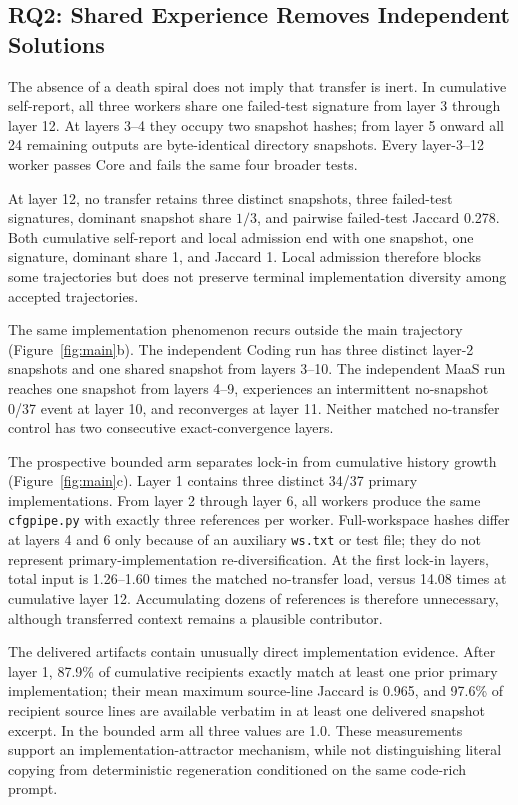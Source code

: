 \documentclass[letterpaper]{article}
\begin{document}
\subsection{RQ2: Shared Experience Removes Independent Solutions}

The absence of a death spiral does not imply that transfer is inert.
In cumulative self-report, all three workers share one failed-test signature
from layer 3 through layer 12.
At layers 3--4 they occupy two snapshot hashes; from layer 5 onward all 24
remaining outputs are byte-identical directory snapshots. Every layer-3--12
worker passes Core and fails the same four broader tests.

At layer 12, no transfer retains three distinct snapshots, three failed-test
signatures, dominant snapshot share $1/3$, and pairwise failed-test Jaccard
0.278. Both cumulative self-report and local admission end with one snapshot,
one signature, dominant share 1, and Jaccard 1. Local admission therefore blocks
some trajectories but does not preserve terminal implementation diversity among
accepted trajectories.

The same implementation phenomenon recurs outside the main trajectory
(Figure~\ref{fig:main}b). The independent Coding run has three distinct layer-2
snapshots and one shared snapshot from layers 3--10. The independent MaaS run
reaches one snapshot from layers 4--9, experiences an intermittent no-snapshot
0/37 event at layer 10, and reconverges at layer 11. Neither matched no-transfer
control has two consecutive exact-convergence layers.

The prospective bounded arm separates lock-in from cumulative history growth
(Figure~\ref{fig:main}c). Layer 1 contains three distinct 34/37 primary
implementations. From layer 2 through layer 6, all workers produce the same
\texttt{cfgpipe.py} with exactly three references per worker. Full-workspace
hashes differ at layers 4 and 6 only because of an auxiliary \texttt{ws.txt} or
test file; they do not represent primary-implementation re-diversification. At
the first lock-in layers, total input is 1.26--1.60 times the matched no-transfer
load, versus 14.08 times at cumulative layer 12. Accumulating dozens of references
is therefore unnecessary, although transferred context remains a plausible
contributor.

The delivered artifacts contain unusually direct implementation evidence. After
layer 1, 87.9\% of cumulative recipients exactly match at least one prior primary
implementation; their mean maximum source-line Jaccard is 0.965, and 97.6\% of
recipient source lines are available verbatim in at least one delivered snapshot
excerpt. In the bounded arm all three values are 1.0. These measurements support
an implementation-attractor mechanism, while not distinguishing literal copying
from deterministic regeneration conditioned on the same code-rich prompt.
\end{document}
